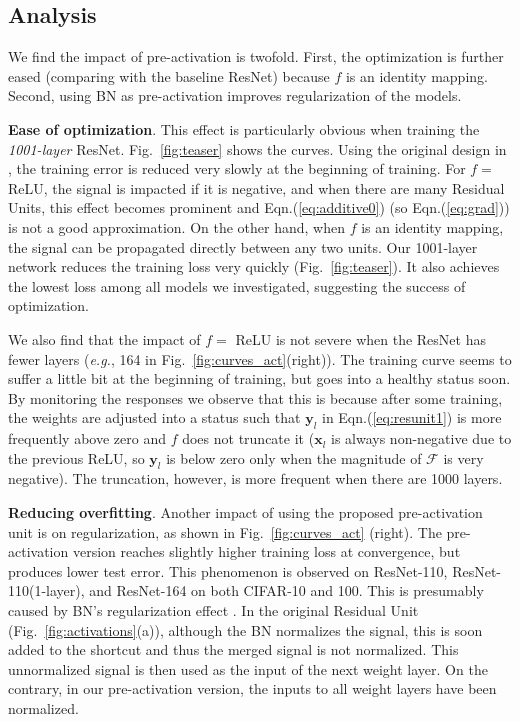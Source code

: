 \documentclass[runningheads]{llncs}
\def\eg{\emph{e.g.}}
\newcommand{\ve}[1]{\mathbf{#1}} \newcommand{\ma}[1]{\mathrm{#1}}
\begin{document}
\subsection{Analysis}

We find the impact of pre-activation is twofold. First, the optimization is further eased (comparing with the baseline ResNet) because $f$ is an identity mapping. Second, using BN as pre-activation improves regularization of the models.

\textbf{Ease of optimization}. This effect is particularly obvious when training the \emph{1001-layer} ResNet. Fig.~\ref{fig:teaser} shows the curves. Using the original design in \cite{He2016}, the training error is reduced very slowly at the beginning of training. For $f=$ ReLU, the signal is impacted if it is negative, and when there are many Residual Units, this effect becomes prominent and Eqn.(\ref{eq:additive0}) (so Eqn.(\ref{eq:grad})) is not a good approximation. On the other hand, when $f$ is an identity mapping, the signal can be propagated directly between any two units. Our 1001-layer network reduces the training loss very quickly (Fig.~\ref{fig:teaser}). It also achieves the lowest loss among all models we investigated, suggesting the success of optimization.

We also find that the impact of $f=$ ReLU is not severe when the ResNet has fewer layers (\eg, 164 in Fig.~\ref{fig:curves_act}(right)). The training curve seems to suffer a little bit at the beginning of training, but goes into a healthy status soon. By monitoring the responses we observe that this is because after some training, the weights are adjusted into a status such that $\ve{y}_l$ in Eqn.(\ref{eq:resunit1}) is more frequently above zero and $f$ does not truncate it ($\ve{x}_l$ is always non-negative due to the previous ReLU, so $\ve{y}_l$ is below zero only when the magnitude of $\mathcal{F}$ is very negative). The truncation, however, is more frequent when there are 1000 layers.

\textbf{Reducing overfitting}. Another impact of using the proposed pre-activation unit is on regularization, as shown in Fig.~\ref{fig:curves_act} (right). The pre-activation version reaches slightly higher training loss at convergence, but produces lower test error. This phenomenon is observed on ResNet-110, ResNet-110(1-layer), and ResNet-164 on both CIFAR-10 and 100. This is presumably caused by BN's regularization effect \cite{Ioffe2015}. In the original Residual Unit (Fig.~\ref{fig:activations}(a)), although the BN normalizes the signal, this is soon added to the shortcut and thus the merged signal is not normalized. This unnormalized signal is then used as the input of the next weight layer. On the contrary, in our pre-activation version, the inputs to all weight layers have been normalized.
\end{document}
